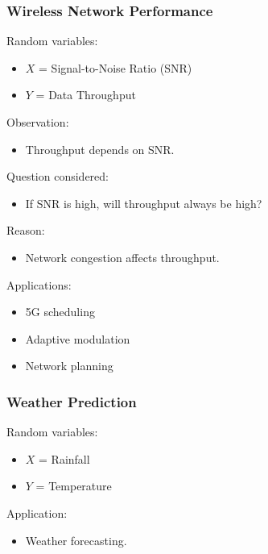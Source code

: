 \documentclass[12pt]{article}
\begin{document}
\subsubsection*{Wireless Network Performance}

Random variables:

\begin{itemize}
\item $X$ = Signal-to-Noise Ratio (SNR)
\item $Y$ = Data Throughput
\end{itemize}

Observation:

\begin{itemize}
\item Throughput depends on SNR.
\end{itemize}

Question considered:

\begin{itemize}
\item If SNR is high, will throughput always be high?
\end{itemize}

Reason:

\begin{itemize}
\item Network congestion affects throughput.
\end{itemize}

Applications:

\begin{itemize}
\item 5G scheduling
\item Adaptive modulation
\item Network planning
\end{itemize}

\subsubsection*{Weather Prediction}

Random variables:

\begin{itemize}
\item $X$ = Rainfall
\item $Y$ = Temperature
\end{itemize}

Application:

\begin{itemize}
\item Weather forecasting.
\end{itemize}
\end{document}
